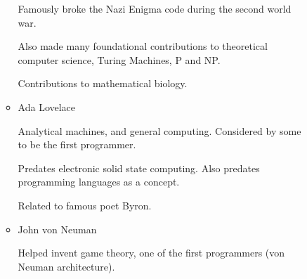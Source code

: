 \documentclass{report}
\begin{document}
\begin{description}
\begin{itemize}
\begin{mdframed}
\begin{itemize}
\begin{mdframed}
                               \vspace{10pt}

                               Famously broke the Nazi Enigma code
                               during the second world war.

                               \vspace{10pt}

                               Also made many foundational contributions
                               to theoretical computer science, Turing
                               Machines, P and NP.

                               \vspace{10pt}

                               Contributions to mathematical biology.
                           \end{mdframed}
                       \item Ada Lovelace
                           \begin{mdframed}
                               Analytical machines, and general
                               computing. Considered by some to
                               be the first programmer.

                               \vspace{10pt}

                               Predates electronic solid state
                               computing. Also predates programming
                               languages as a concept.

                                \vspace{10pt}

                                Related to famous poet Byron.
                           \end{mdframed}
                           \begin{center}
                           \end{center}
                       \item John von Neuman
                           \begin{mdframed}
                               Helped invent game theory,
                               one of the first programmers
                               (von Neuman architecture).


\end{mdframed}
\end{itemize}
\end{mdframed}
\end{itemize}
\end{description}
\end{document}
